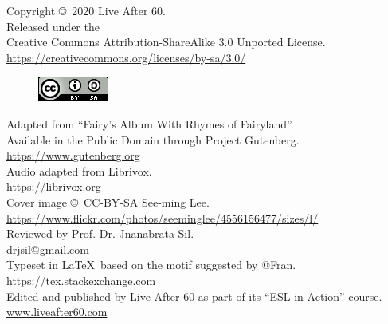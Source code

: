 \documentclass[oneside]{book}
\begin{document}
\newpage
\frontmatter
\vspace*{15ex}
\begin{center}
  Copyright \copyright\ 2020 Live After 60.\\
  Released under the \\
  Creative Commons Attribution-ShareAlike 3.0 Unported License.\\
  \href{https://creativecommons.org/licenses/by-sa/3.0/}{
    https://creativecommons.org/licenses/by-sa/3.0/}
  \begin{figure}[H]
    \centering
    \includegraphics[scale=0.8]{cc-by-sa}
  \end{figure}
  Adapted from ``Fairy's Album With Rhymes of Fairyland''.\\ 
  Available in the Public Domain through Project Gutenberg.\\
  \href{https://www.gutenberg.org}{https://www.gutenberg.org}\\
  \bigskip
  Audio adapted from Librivox.\\
  \href{https://librivox.org}{https://librivox.org}\\
  \bigskip
  Cover image \copyright\ CC-BY-SA See-ming Lee.\\
  \href{https://www.flickr.com/photos/seeminglee/4556156477/sizes/l/}{https://www.flickr.com/photos/seeminglee/4556156477/sizes/l/}\\
  \bigskip
  Reviewed by Prof. Dr. Jnanabrata Sil.\\
  \href{drjsil@gmail.com}{drjsil@gmail.com} \\
  \bigskip
  Typeset in \LaTeX\ based on the motif suggested by @Fran. \\
  \href{https://tex.stackexchange.com}{https://tex.stackexchange.com} \\
  \bigskip
  Edited and published by Live After 60 as part of its ``ESL in Action''
	course.\\
  \href{http://www.liveafter60.com}{www.liveafter60.com}
\end{center}
\vspace*{15ex}
\end{document}
